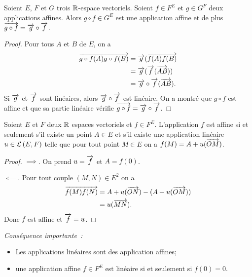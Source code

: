 \begin{prop}
  Soient \(E\), \(F\) et \(G\) trois \(\mathbb{R}\)-espace vectoriels. Soient \(f \in F^E\) et \(g \in G^F\) deux applications affines. Alors \(g \circ f \in G^E\) est une application affine et de plus \(\overrightarrow{g \circ f}=\overrightarrow{g}\circ \overrightarrow{f}\).
\end{prop}
\begin{proof}
  Pour tous \(A\) et \(B\) de \(E\), on a
  \begin{align}
    \overrightarrow{g\circ f(A) g\circ f(B)} &= \overrightarrow{g} (\overrightarrow{f(A)f(B)} \\
    &=\overrightarrow{g}(\overrightarrow{f}(\overrightarrow{AB})) \\
    &=\overrightarrow{g}\circ \overrightarrow{f} (\overrightarrow{AB}).
  \end{align}
  Si \(\overrightarrow{g}\) et \(\overrightarrow{f}\) sont linéaires, alors \(\overrightarrow{g}\circ \overrightarrow{f}\) est linéaire. On a montré que \(g \circ f\) est affine et que sa partie linéaire vérifie \(\overrightarrow{g \circ f}=\overrightarrow{g}\circ \overrightarrow{f}\).
\end{proof}

\begin{prop}
  Soient \(E\) et \(F\) deux \(\mathbb{R}\) espaces vectoriels et \(f \in F^E\). L'application \(f\) est affine si et seulement s'il existe un point \(A\in E\) et s'il existe une application linéaire \(u \in \mathcal{L}\left(E,F\right)\) telle que pour tout point \(M \in E\) on a \(f(M)=A+u(\overrightarrow{OM})\).
\end{prop}
\begin{proof}
  \(\implies\). On prend \(u=\overrightarrow{f}\) et \(A=f(0)\).

  \(\impliedby\). Pour tout couple \((M, N) \in E^2\) on a
  \begin{align}
    \overrightarrow{f(M)f(N)} &= A+u(\overrightarrow{ON}) - (A+u(\overrightarrow{OM})) \\
    &=u(\overrightarrow{MN}).
  \end{align}
  Donc \(f\) est affine et \(\overrightarrow{f}=u\).
\end{proof}

\emph{Conséquence importante~:}
\begin{itemize}
\item Les applications linéaires sont des application affines;
\item une application affine \(f \in F^E\) est linéaire si et seulement si \(f(0)=0\).
\end{itemize}

